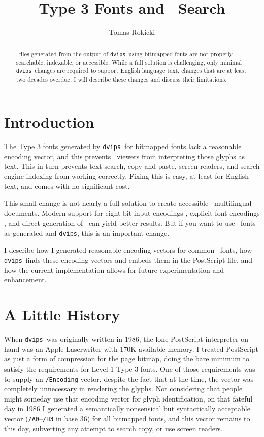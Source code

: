 \documentclass{ltugboat}
\title{Type 3 Fonts and \PDF\ Search}
\author{Tomas Rokicki}
\def\PDF{\acro{PDF}}
\def\dvips{\texttt{dvips}}
\begin{document}
\maketitle

\begin{abstract}
\PDF\ files generated from the output of \dvips\ using
bitmapped fonts are not properly searchable,
indexable, or accessible.  While a full solution is challenging,
only minimal \dvips\ changes are required to support
English language text, changes that are at least two decades overdue.
I will describe these changes and discuss their limitations.
\end{abstract}

\section{Introduction}

The Type 3 fonts generated by \dvips\ for bitmapped fonts
lack a reasonable encoding vector, and this prevents \PDF\ 
viewers from interpreting those glyphs as text.  This in turn
prevents text search, copy and paste, screen readers, and
search engine indexing from working correctly.  Fixing this is
easy, at least for English text, and comes with no significant
cost.

This small change is not nearly a full solution to create
accessible \PDF\ multilingual documents.  Modern support
for eight-bit input encodings \cite{ENC}, explicit font encodings \cite{MMAP},
and direct generation of \PDF\ can yield better results.
But if you want to use \MF\ fonts as-generated and \dvips,
this is an important change.

I describe how I generated reasonable encoding vectors
for common \MF\ fonts, how \dvips\ finds these
encoding vectors and embeds them in the PostScript file, and
how the current implementation allows for future
experimentation and enhancement.

\section{A Little History}

When \dvips\ was originally written in 1986, the lone
PostScript interpreter on hand was an Apple Laserwriter with
170K available memory.  I treated PostScript as just a form of
compression for the page bitmap, doing the bare minimum to
satisfy the requirements for Level 1 Type 3 fonts.  One of
those requirements was to supply an \texttt{/Encoding} vector,
despite the fact that at the time, the vector was completely
unnecessary in rendering the glyphs.  Not considering that people
might someday use that encoding vector for glyph identification,
on that fateful day in 1986
I generated a semantically nonsensical but syntactically acceptable
vector (\texttt{/A0}--\texttt{/H3} in base 36) for all bitmapped
fonts, and
this vector remains to this day, subverting any attempt to search
copy, or use screen readers.
\end{document}
